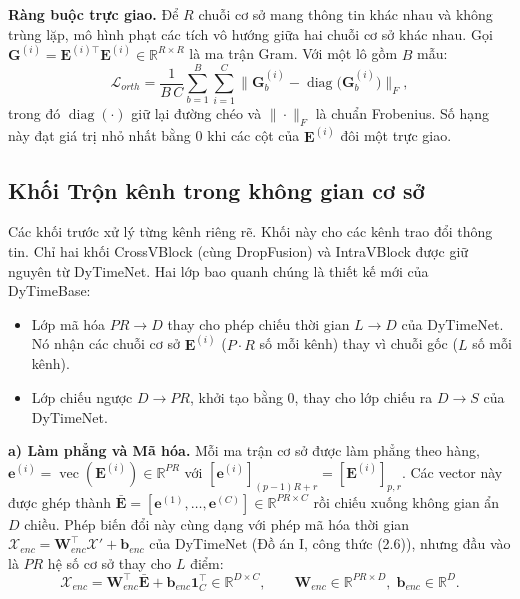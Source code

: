 \documentclass[12pt,a4paper]{report}
\numberwithin{equation}{chapter}
\newcommand{\R}{\mathbb{R}}
\newcommand{\one}{\mathbf{1}}
\newcommand{\vecr}{\operatorname{vec}}
\begin{document}
\textbf{Ràng buộc trực giao.} Để $R$ chuỗi cơ sở mang thông tin khác nhau và không trùng lặp, mô hình phạt các tích
vô hướng giữa hai chuỗi cơ sở khác nhau. Gọi $\mathbf{G}^{(i)}=\mathbf{E}^{(i)\top}\mathbf{E}^{(i)}\in\R^{R\times R}$
là ma trận Gram. Với một lô gồm $B$ mẫu:
\begin{equation}
\mathcal{L}_{orth} = \frac{1}{B\,C}\sum_{b=1}^{B}\sum_{i=1}^{C}
\Big\|\mathbf{G}^{(i)}_b - \operatorname{diag}\big(\mathbf{G}^{(i)}_b\big)\Big\|_F ,
\label{eq:orth}
\end{equation}
trong đó $\operatorname{diag}(\cdot)$ giữ lại đường chéo và $\|\cdot\|_F$ là chuẩn Frobenius. Số hạng này đạt giá
trị nhỏ nhất bằng 0 khi các cột của $\mathbf{E}^{(i)}$ đôi một trực giao.

\subsection{Khối Trộn kênh trong không gian cơ sở}
\label{sec:mixing}

Các khối trước xử lý từng kênh riêng rẽ. Khối này cho các kênh trao đổi thông tin. Chỉ hai khối CrossVBlock (cùng
DropFusion) và IntraVBlock được giữ nguyên từ DyTimeNet. Hai lớp bao quanh chúng là thiết kế mới của DyTimeBase:
\begin{itemize}
  \item Lớp mã hóa $PR\to D$ thay cho phép chiếu thời gian $L\to D$ của DyTimeNet. Nó nhận các chuỗi cơ sở
        $\mathbf{E}^{(i)}$ ($P\cdot R$ số mỗi kênh) thay vì chuỗi gốc ($L$ số mỗi kênh).
  \item Lớp chiếu ngược $D\to PR$, khởi tạo bằng 0, thay cho lớp chiếu ra $D\to S$ của DyTimeNet.
\end{itemize}

\textbf{a) Làm phẳng và Mã hóa.} Mỗi ma trận cơ sở được làm phẳng theo hàng,
$\mathbf{e}^{(i)}=\vecr(\mathbf{E}^{(i)})\in\R^{PR}$ với $[\mathbf{e}^{(i)}]_{(p-1)R+r}=[\mathbf{E}^{(i)}]_{p,r}$.
Các vector này được ghép thành $\bar{\mathbf{E}}=[\mathbf{e}^{(1)},\dots,\mathbf{e}^{(C)}]\in\R^{PR\times C}$ rồi chiếu
xuống không gian ẩn $D$ chiều. Phép biến đổi này cùng dạng với phép mã hóa thời gian
$\mathcal{X}_{enc}=\mathbf{W}_{enc}^{\top}\mathcal{X}'+\mathbf{b}_{enc}$ của DyTimeNet (Đồ án I, công thức (2.6)), nhưng
đầu vào là $PR$ hệ số cơ sở thay cho $L$ điểm:
\begin{equation}
\mathcal{X}_{enc} = \mathbf{W}_{enc}^{\top}\bar{\mathbf{E}} + \mathbf{b}_{enc}\one_C^{\top}\in\R^{D\times C},
\qquad \mathbf{W}_{enc}\in\R^{PR\times D},\;\mathbf{b}_{enc}\in\R^{D}.
\label{eq:embed}
\end{equation}
\end{document}
